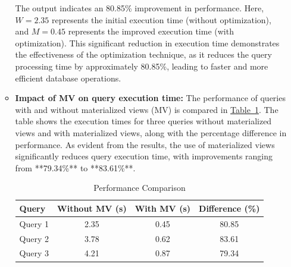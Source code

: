 \begin{enumerate}
\begin{itemize}

The output indicates an 80.85\% improvement in performance. Here, \( W = 2.35 \) represents the initial execution time (without optimization), and \( M = 0.45 \) represents the improved execution time (with optimization). This significant reduction in execution time demonstrates the effectiveness of the optimization technique, as it reduces the query processing time by approximately 80.85\%, leading to faster and more efficient database operations.\vspace{.4cm}

\item \textbf{Impact of MV on query execution time:} The performance of queries with and without materialized views (MV) is compared in \hyperref[tab:performance]{Table~\ref*{tab:performance}}. The table shows the execution times for three queries without materialized views and with materialized views, along with the percentage difference in performance. As evident from the results, the use of materialized views significantly reduces query execution time, with improvements ranging from **79.34\%** to **83.61\%**.

\begin{table}[h!]
    \centering
    \caption{Performance Comparison}
    \label{tab:performance}
    \begin{tabular}{lccc}
        \toprule
        \rowcolor{blue!10} %
        \textbf{Query} & \textbf{Without MV (s)} & \textbf{With MV (s)} & \textbf{Difference (\%)} \\
        \midrule
        Query 1 & 2.35 & 0.45 & \cellcolor{white!20}80.85 \\
        Query 2 & 3.78 & 0.62 & \cellcolor{gray!10}83.61 \\
        Query 3 & 4.21 & 0.87 & \cellcolor{white!20}79.34 \\
        \bottomrule
    \end{tabular}
\end{table}





\end{itemize}
\end{enumerate}

